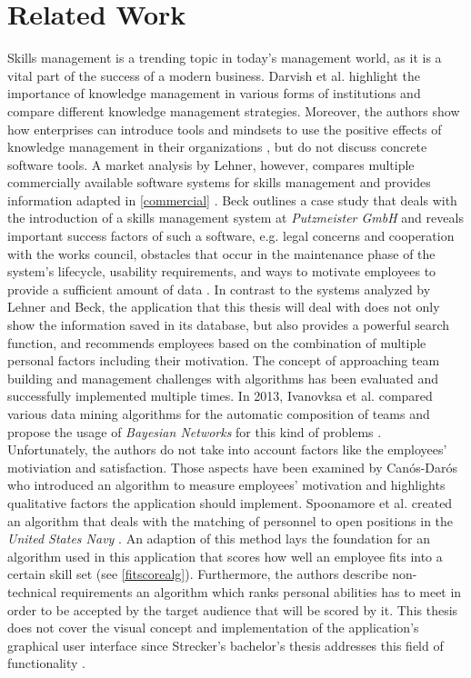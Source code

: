 \chapter{Related Work}

Skills management is a trending topic in today's management world, as it is a vital part of the success of a modern business.
Darvish et al. highlight the importance of knowledge management in various forms of institutions and compare different knowledge management strategies.
Moreover, the authors show how enterprises can introduce tools and mindsets to use the positive effects of knowledge management in their organizations \cite{darvish}, but do not discuss concrete software tools.
A market analysis by Lehner, however, compares multiple commercially available software systems for skills management and provides information adapted in \ref{commercial}  \cite{Marktanalyse}.
\newline
Beck outlines a case study that deals with the introduction of a skills management system at \textit{Putzmeister GmbH} and reveals important success factors of such a software, e.g. legal concerns and cooperation with the works council, obstacles that occur in the maintenance phase of the system's lifecycle, usability requirements, and ways to motivate employees to provide a sufficient amount of data \cite{beck}.
\newline
In contrast to the systems analyzed by Lehner and Beck, the application that this thesis will deal with does not only
show the information saved in its database, but also provides a powerful search function, and recommends employees based on the combination of multiple personal factors including their motivation.
\newline
The concept of approaching team building and management challenges with algorithms has been evaluated and successfully implemented multiple times.
In 2013, Ivanovksa et al. compared various data mining algorithms for the automatic composition of teams and propose the usage of \textit{Bayesian Networks} for this kind of problems \cite{ivanovska}. Unfortunately, the authors do not take into account factors like the employees' motiviation and satisfaction. Those aspects have been examined by Canós-Darós who introduced an algorithm to measure employees' motivation \cite{CanosDaros2013} and highlights qualitative factors the application should implement.
Spoonamore et al. created an algorithm that deals with the matching of personnel to open positions in the \textit{United States Navy} \cite{USN}. An adaption of this method lays the foundation for an algorithm used in this application that scores how well an employee fits into a certain skill set (see \ref{fitscorealg}). Furthermore, the authors describe non-technical requirements an algorithm which ranks personal abilities has to
meet in order to be accepted by the target audience that will be scored by it.
\newline
This thesis does not cover the visual concept and implementation of the application's graphical user interface since
Strecker's bachelor's thesis addresses this field of functionality \cite{strecker}.
